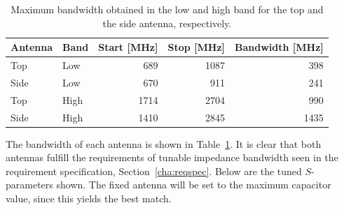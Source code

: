 \begin{table}[htbp]
    \centering
    \begin{tabular}{|l|l|r|r|r|}
        \hline
        Antenna & Band & Start [MHz] & Stop [MHz] & Bandwidth [MHz] \\
        \hline
        Top     & Low  & 689         & 1087       & 398 \\
        Side    & Low  & 670         & 911        & 241 \\
        \hline
        Top     & High & 1714        & 2704       & 990 \\
        Side    & High & 1410        & 2845       & 1435 \\
        \hline
    \end{tabular}
    \caption{Maximum bandwidth obtained in the low and high band for the top and the side antenna, respectively.}
    \label{tab:bw_sol3}
\end{table}

The bandwidth of each antenna is shown in Table~\ref{tab:bw_sol3}. It is clear that both antennas fulfill the requirements of tunable impedance bandwidth seen in the requirement specification, Section~\ref{cha:reqspec}. Below are the tuned $S$-parameters shown. The fixed antenna will be set to the maximum capacitor value, since this yields the best match.  

